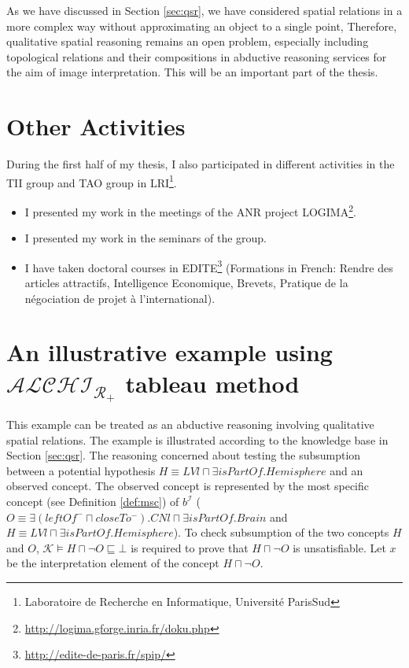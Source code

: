 \documentclass{article}
\begin{document}
As we have discussed in Section \ref{sec:qsr}, we have considered spatial relations in a more complex way without approximating an object to a single point,
Therefore, qualitative spatial reasoning remains an open problem, especially including topological relations and their compositions in abductive reasoning services for the aim of image interpretation.
This will be an important part of the thesis.

\section{Other Activities}
During the first half of my thesis, I also participated in different activities in the TII group and TAO group 
in LRI\footnote{Laboratoire de Recherche en Informatique, Universit\'{e} ParisSud}.
\begin{itemize}
 \item I presented my work in the meetings of the ANR project LOGIMA\footnote{\url{http://logima.gforge.inria.fr/doku.php}}.
 \item I presented my work in the seminars of the group.
 \item I have taken doctoral courses in EDITE\footnote{\url{http://edite-de-paris.fr/spip/}}
 (Formations in French: Rendre des articles attractifs, Intelligence Economique, Brevets, Pratique de la négociation de projet à l'international).
\end{itemize}

\appendix
\section{An illustrative example using $\mathcal{ALCHI_{R_+}}$ tableau method}
\label{Appendix A}

This example can be treated as an abductive reasoning involving qualitative spatial relations.
The example is illustrated according to the knowledge base in Section \ref{sec:qsr}.
The reasoning concerned about testing the subsumption between a potential hypothesis $H\equiv LVl\sqcap \exists isPartOf.Hemisphere$ and an observed concept.
The observed concept is represented by the most specific concept (see Definition \ref{def:msc}) of  $b^\mathcal{I}$
($O\equiv \exists (leftOf^-\sqcap closeTo^-). CNl\sqcap \exists isPartOf.Brain$ and $H\equiv LVl\sqcap \exists isPartOf.Hemisphere$).
To check subsumption of the two concepts $H$ and $O$, $\mathcal{K} \vDash H\sqcap \neg O \sqsubseteq \bot$ is required to prove that $H\sqcap \neg O$ is unsatisfiable.
Let $x$ be the interpretation element of the concept $H\sqcap \neg O$.
\end{document}
